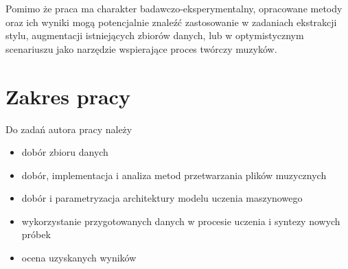 {{        Pomimo że praca ma charakter badawczo-eksperymentalny, 
        opracowane metody oraz ich wyniki mogą potencjalnie znaleźć zastosowanie
        w zadaniach ekstrakcji stylu, augmentacji istniejących zbiorów danych,
        lub w optymistycznym scenariuszu jako narzędzie wspierające proces twórczy muzyków.
    }

    \section{Zakres pracy}
    {
        Do zadań autora pracy należy
        \begin{itemize}
            \item dobór zbioru danych
            \item dobór, implementacja i analiza metod przetwarzania plików muzycznych
            \item dobór i parametryzacja architektury modelu uczenia maszynowego
            \item wykorzystanie przygotowanych danych 
            w procesie uczenia i syntezy nowych próbek
            \item ocena uzyskanych wyników
        \end{itemize}
    }
}


